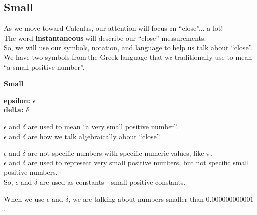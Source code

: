\documentclass{ximera}
\begin{document}
\subsection*{Small}



As we move toward Calculus, our attention will focus on ``close''... a lot! \\


The word \textbf{instantaneous} will describe our ``close'' measurements. \\


So, we will use our symbols, notation, and language to help us talk about ``close''. \\


We have two symbols from the Greek language that we traditionally use to mean ``a small positive number''. \\



\begin{notation} \textbf{\textcolor{red!80!black}{Small}} 


\textbf{\textcolor{blue!55!black}{epsilon:}}  $\epsilon$ \\

\textbf{\textcolor{blue!55!black}{delta:}}  $\delta$ \\


\end{notation}

$\epsilon$ and $\delta$ are used to mean ``a very small positive number''. \\  


$\epsilon$ and $\delta$ are how we talk algebraically about ``close''. \\





\begin{warning}


$\epsilon$ and $\delta$ are not specific numbers with specific numeric values, like $\pi$. \\


$\epsilon$ and $\delta$ are used to represent very small positive numbers, but not specific small positive numbers. \\


So, $\epsilon$ and $\delta$ are used as constants - small positive constants.


When we use $\epsilon$ and $\delta$, we are talking about numbers smaller than $0.000000000001$. 


\end{warning}
\end{document}
